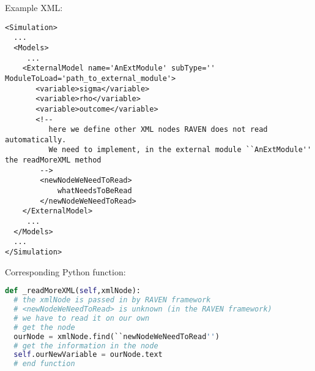Example XML:
\begin{lstlisting}[style=XML,morekeywords={subType,ModuleToLoad}]
<Simulation>
  ...
  <Models>
     ...
    <ExternalModel name='AnExtModule' subType='' ModuleToLoad='path_to_external_module'>
       <variable>sigma</variable>
       <variable>rho</variable>
       <variable>outcome</variable>
       <!--
          here we define other XML nodes RAVEN does not read automatically.
          We need to implement, in the external module ``AnExtModule'' the readMoreXML method
        -->
        <newNodeWeNeedToRead>
            whatNeedsToBeRead
        </newNodeWeNeedToRead>
    </ExternalModel>
     ...
  </Models>
  ...
</Simulation>
\end{lstlisting}

Corresponding Python function:
\begin{lstlisting}[language=python]
def _readMoreXML(self,xmlNode):
  # the xmlNode is passed in by RAVEN framework
  # <newNodeWeNeedToRead> is unknown (in the RAVEN framework)
  # we have to read it on our own
  # get the node
  ourNode = xmlNode.find(``newNodeWeNeedToRead'')
  # get the information in the node
  self.ourNewVariable = ourNode.text
  # end function
\end{lstlisting}
